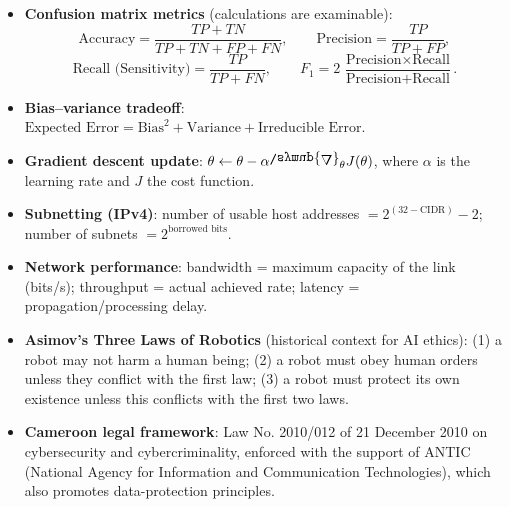\documentclass[11pt]{article}
\newcommand{\cle}[1]{{\popxbold\color{popdark}#1}}
\def\nabla{\mathord{\raisebox{\depth}{\scalebox{1}[-1]{$\symup{\Delta}$}}}}%
\begin{document}
\begin{aretenir}
\begin{itemize}
    \item \textbf{Confusion matrix metrics} (calculations are examinable):
    \[
    \text{Accuracy} = \frac{TP+TN}{TP+TN+FP+FN},\qquad
    \text{Precision} = \frac{TP}{TP+FP},
    \]
    \[
    \text{Recall (Sensitivity)} = \frac{TP}{TP+FN},\qquad
    F_1 = 2\,\frac{\text{Precision}\times\text{Recall}}{\text{Precision}+\text{Recall}} .
    \]
    \item \textbf{Bias--variance tradeoff}: $\text{Expected Error} = \text{Bias}^{2} + \text{Variance} + \text{Irreducible Error}$.
    \item \textbf{Gradient descent update}: $\theta \leftarrow \theta - \alpha \nabla_{\theta} J(\theta)$, where $\alpha$ is the learning rate and $J$ the cost function.
    \item \textbf{Subnetting (IPv4)}: number of usable host addresses $= 2^{(32-\text{CIDR})} - 2$; number of subnets $= 2^{\text{borrowed bits}}$.
    \item \textbf{Network performance}: bandwidth = maximum capacity of the link (bits/s); throughput = actual achieved rate; latency = propagation/processing delay.
    \item \textbf{Asimov's Three Laws of Robotics} (historical context for AI ethics): (1) a robot may not harm a human being; (2) a robot must obey human orders unless they conflict with the first law; (3) a robot must protect its own existence unless this conflicts with the first two laws.
    \item \textbf{Cameroon legal framework}: Law No. 2010/012 of 21 December 2010 on cybersecurity and cybercriminality, enforced with the support of \cle{ANTIC} (National Agency for Information and Communication Technologies), which also promotes data-protection principles.
\end{itemize}
\end{aretenir}
\end{document}
